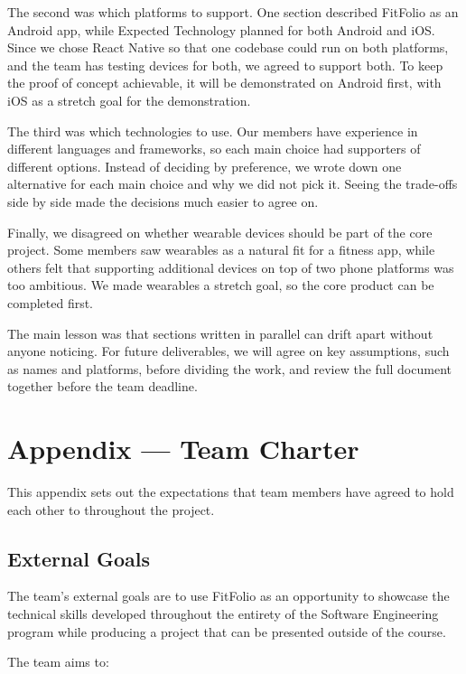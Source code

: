 \documentclass{article}
\begin{document}
The second was which platforms to support. One section described FitFolio as an Android app, while Expected Technology planned for both Android and iOS. Since we chose React Native so that one codebase could run on both platforms, and the team has testing devices for both, we agreed to support both. To keep the proof of concept achievable, it will be demonstrated on Android first, with iOS as a stretch goal for the demonstration.

The third was which technologies to use. Our members have experience in different languages and frameworks, so each main choice had supporters of different options. Instead of deciding by preference, we wrote down one alternative for each main choice and why we did not pick it. Seeing the trade-offs side by side made the decisions much easier to agree on.

Finally, we disagreed on whether wearable devices should be part of the core project. Some members saw wearables as a natural fit for a fitness app, while others felt that supporting additional devices on top of two phone platforms was too ambitious. We made wearables a stretch goal, so the core product can be completed first.

The main lesson was that sections written in parallel can drift apart without anyone noticing. For future deliverables, we will agree on key assumptions, such as names and platforms, before dividing the work, and review the full document together before the team deadline.

\newpage{}

\section*{Appendix --- Team Charter}


This appendix sets out the expectations that team members have agreed to hold each other to throughout the project.

\subsection*{External Goals}

The team's external goals are to use FitFolio as an opportunity to showcase the 
technical skills developed throughout the entirety of the Software Engineering program 
while producing a project that can be presented outside of the course.

The team aims to:
\end{document}
